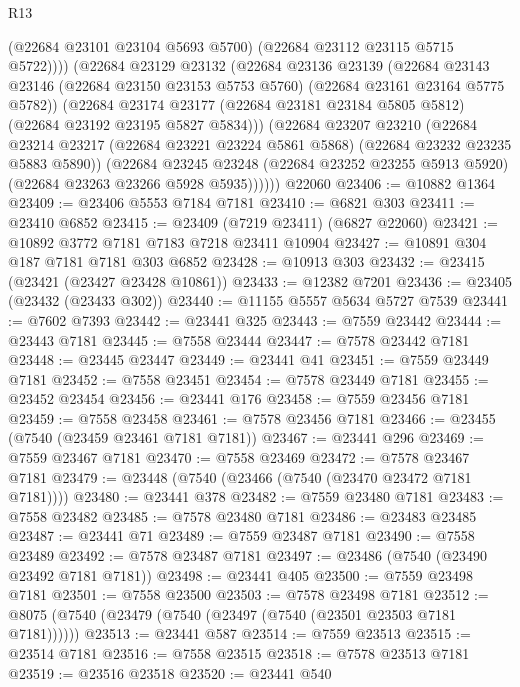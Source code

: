 \begin{lexlean}{R13}
\begin{coremodule}
              (@22684 @23101 @23104 @5693 @5700)
              (@22684 @23112 @23115 @5715 @5722))))
        (@22684
          @23129
          @23132
          (@22684
            @23136
            @23139
            (@22684
              @23143
              @23146
              (@22684 @23150 @23153 @5753 @5760)
              (@22684 @23161 @23164 @5775 @5782))
            (@22684
              @23174
              @23177
              (@22684 @23181 @23184 @5805 @5812)
              (@22684 @23192 @23195 @5827 @5834)))
          (@22684
            @23207
            @23210
            (@22684
              @23214
              @23217
              (@22684 @23221 @23224 @5861 @5868)
              (@22684 @23232 @23235 @5883 @5890))
            (@22684
              @23245
              @23248
              (@22684 @23252 @23255 @5913 @5920)
              (@22684 @23263 @23266 @5928 @5935))))))
    @22060
@23406 := @10882 @1364
@23409 := @23406 @5553 @7184 @7181
@23410 := @6821 @303
@23411 := @23410 @6852
@23415 := @23409 (@7219 @23411) (@6827 @22060)
@23421 := @10892 @3772 @7181 @7183 @7218 @23411 @10904
@23427 := @10891 @304 @187 @7181 @7181 @303 @6852
@23428 := @10913 @303
@23432 := @23415 (@23421 (@23427 @23428 @10861))
@23433 := @12382 @7201
@23436 := @23405 (@23432 (@23433 @302))
@23440 := @11155 @5557 @5634 @5727 @7539
@23441 := @7602 @7393
@23442 := @23441 @325
@23443 := @7559 @23442
@23444 := @23443 @7181
@23445 := @7558 @23444
@23447 := @7578 @23442 @7181
@23448 := @23445 @23447
@23449 := @23441 @41
@23451 := @7559 @23449 @7181
@23452 := @7558 @23451
@23454 := @7578 @23449 @7181
@23455 := @23452 @23454
@23456 := @23441 @176
@23458 := @7559 @23456 @7181
@23459 := @7558 @23458
@23461 := @7578 @23456 @7181
@23466 := @23455 (@7540 (@23459 @23461 @7181 @7181))
@23467 := @23441 @296
@23469 := @7559 @23467 @7181
@23470 := @7558 @23469
@23472 := @7578 @23467 @7181
@23479 := @23448 (@7540 (@23466 (@7540 (@23470 @23472 @7181 @7181))))
@23480 := @23441 @378
@23482 := @7559 @23480 @7181
@23483 := @7558 @23482
@23485 := @7578 @23480 @7181
@23486 := @23483 @23485
@23487 := @23441 @71
@23489 := @7559 @23487 @7181
@23490 := @7558 @23489
@23492 := @7578 @23487 @7181
@23497 := @23486 (@7540 (@23490 @23492 @7181 @7181))
@23498 := @23441 @405
@23500 := @7559 @23498 @7181
@23501 := @7558 @23500
@23503 := @7578 @23498 @7181
@23512 := @8075 (@7540 (@23479 (@7540 (@23497 (@7540 (@23501 @23503 @7181 @7181))))))
@23513 := @23441 @587
@23514 := @7559 @23513
@23515 := @23514 @7181
@23516 := @7558 @23515
@23518 := @7578 @23513 @7181
@23519 := @23516 @23518
@23520 := @23441 @540

\end{coremodule}
\end{lexlean}
